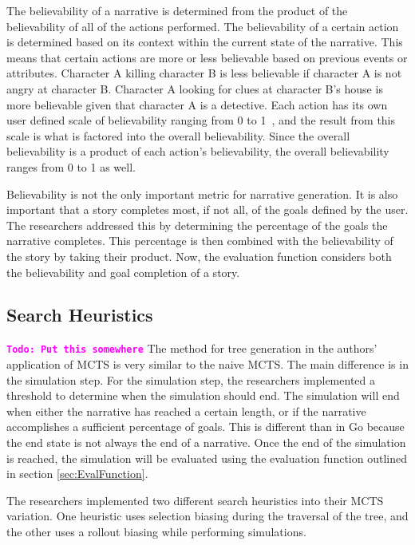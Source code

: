 \documentclass{sig-alternate}
\newcommand{\comment}[1]{{\bf \tt  {#1}}}
\newcommand{\todo}[1]{\textcolor{magenta}{\comment{Todo: {#1}}}}
\begin{document}
The believability of a narrative is determined from the product of the believability of all of the actions performed. The believability of a certain action is determined based on its context within the current state of the narrative. This means that certain actions are more or less believable based on previous events or attributes. Character A killing character B is less believable if character A is not angry at character B. Character A looking for clues at character B's house is more believable given that character A is a detective. Each action has its own user defined scale of believability ranging from 0 to 1~\cite{Narrative}, and the result from this scale is what is factored into the overall believability. Since the overall believability is a product of each action's believability, the overall believability ranges from 0 to 1 as well.

Believability is not the only important metric for narrative generation. It is also important that a story completes most, if not all, of the goals defined by the user. The researchers addressed this by determining the percentage of the goals the narrative completes. This percentage is then combined with the believability of the story by taking their product. Now, the evaluation function considers both the believability and goal completion of a story. 

\subsection{Search Heuristics}
\todo{Put this somewhere}
The method for tree generation in the authors' application of MCTS is very similar to the naive MCTS. The main difference is in the simulation step. For the simulation step, the researchers implemented a threshold to determine when the simulation should end. The simulation will end when either the narrative has reached a certain length, or if the narrative accomplishes a sufficient percentage of goals. This is different than in Go because the end state is not always the end of a narrative. Once the end of the simulation is reached, the simulation will be evaluated using the evaluation function outlined in section \ref{sec:EvalFunction}.

The researchers implemented two different search heuristics into their MCTS variation. One heuristic uses selection biasing during the traversal of the tree, and the other uses a rollout biasing while performing simulations.
\end{document}
